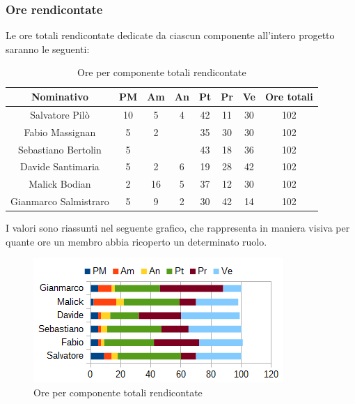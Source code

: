 		\subsubsection{Ore rendicontate}
		Le ore totali rendicontate dedicate da ciascun componente all'intero progetto saranno le seguenti: \\
		\begin{table}[H]
		\centering
		\begin{tabular}{|c|c|c|c|c|c|c|c|}
			\hline
			\textbf{Nominativo}		& \textbf{PM}	& \textbf{Am}	& \textbf{An}	& \textbf{Pt}	& \textbf{Pr}	& \textbf{Ve}	& \textbf{Ore totali}     \\
			\hline
			Salvatore Pilò			& 10	& 5		& 4		& 42	& 11	& 30	& 102 \\
			Fabio Massignan			& 5		& 2		& 		& 35	& 30	& 30	& 102 \\
			Sebastiano Bertolin		& 5		& 		& 		& 43	& 18	& 36	& 102 \\
			Davide Santimaria		& 5		& 2		& 6		& 19	& 28	& 42	& 102 \\
			Malick Bodian			& 2		& 16	& 5		& 37	& 12	& 30	& 102 \\
			Gianmarco Salmistraro	& 5		& 9		& 2		& 30	& 42	& 14	& 102 \\
			\hline
		\end{tabular}
		\caption{Ore per componente totali rendicontate}
		\end{table}
		I valori sono riassunti nel seguente grafico, che rappresenta in maniera visiva per quante ore un membro abbia ricoperto un determinato ruolo. \\
		\begin{figure}[H]
			\centering
			\includegraphics[width=1\linewidth]{immagini/grafici/orario_rendicontato-barra.png}
			\caption{Ore per componente totali rendicontate}
		\end{figure}